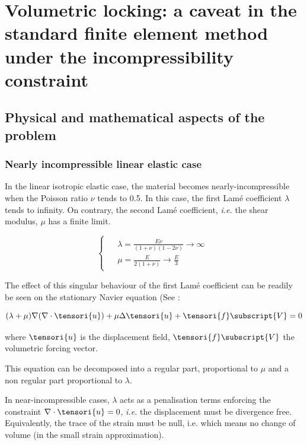 \section{Volumetric locking: a caveat in the standard finite element method under the incompressibility constraint} 
\label{sec_volumetric_locking}

\subsection{Physical and mathematical aspects of the problem}

\subsubsection{Nearly incompressible linear elastic case}

In the linear isotropic elastic case, the material becomes
nearly-incompressible when the Poisson ratio $\nu$ tends to 0.5.
In this case, the first Lamé coefficient $\lambda$ tends to infinity.
On contrary, the second Lamé coefficient, \textit{i.e.} the shear modulus,
$\mu$ has a finite limit.

\begin{equation}
    \begin{cases}
        \begin{aligned}
            & \lambda = \frac{E\nu}{(1+\nu)(1-2\nu)}\to\infty
            \\
            & \mu = \frac{E}{2(1+\nu)}\to\frac{E}{3}
        \end{aligned}
    \end{cases}
\end{equation}

The effect of this singular behaviour of the first Lamé coefficient can be
readily be seen on the stationary Navier equation (See
\cite{shilt_solution_2020}:

\begin{equation}
    (\lambda + \mu) \nabla (\nabla \cdot \tensori{u}) + \mu \Delta \tensori{u} + \tensori{f}\subscript{V} = 0
\end{equation}

where $\tensori{u}$ is the displacement field, $\tensori{f}\subscript{V}$ the
volumetric forcing vector.

This equation can be decomposed into a regular part, proportional to
$\mu$ and a non regular part proportional to $\lambda$.

In near-incompressible cases, $\lambda$ acts as a penalisation terms
enforcing the constraint $\nabla\cdot\tensori{u} = 0$, \textit{i.e.} the
displacement must be divergence free. Equivalently, the trace of the
strain must be null, i.e. which means no change of volume (in the small
strain approximation).

